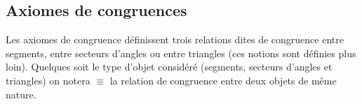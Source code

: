         \subsection{Axiomes de congruences}\setcounter{axi}{0}\setcounter{serieaxiom}{3}

Les axiomes de congruence définissent trois relations dites de congruence entre segments, entre secteurs d'angles ou entre triangles (ces notions sont définies plus loin). Quelques soit le type d'objet considéré (segments, secteurs d'angles et triangles) on notera $\equiv$ la relation de congruence entre deux objets de même nature.


